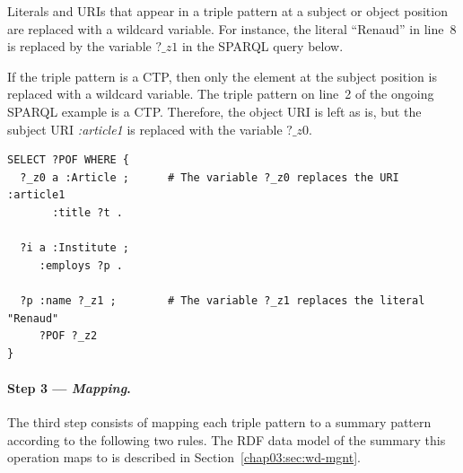 Literals and URIs that appear in a triple pattern at a subject or object position are replaced with a wildcard variable.
For instance, the literal ``Renaud'' in line~8 is replaced by the variable $?\_z1$ in the SPARQL query below.

If the triple pattern is a CTP, then only the element at the subject position is replaced with a wildcard variable.
The triple pattern on line~2 of the ongoing SPARQL example is a CTP. Therefore, the object URI is left as is, but the subject URI \emph{:article1} is replaced with the variable $?\_z0$.

\begin{verbatim}
SELECT ?POF WHERE {
  ?_z0 a :Article ;      # The variable ?_z0 replaces the URI :article1
       :title ?t .
 
  ?i a :Institute ;
     :employs ?p .
 
  ?p :name ?_z1 ;        # The variable ?_z1 replaces the literal "Renaud"
     ?POF ?_z2
}
\end{verbatim}

\paragraph{Step 3 --- \emph{Mapping}.}

The third step consists of mapping each triple pattern to a summary pattern according to the following two rules.
The RDF data model of the summary this operation maps to is described in Section~\ref{chap03:sec:wd-mgnt}.

